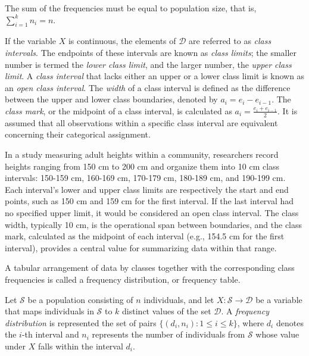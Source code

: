The sum of the frequencies must be equal to population size, that is, $\sum_{i=1}^k n_i = n$.

If the variable $X$ is continuous, the elements of $\mathcal{D}$ are referred to as \emph{class intervals}. The endpoints of these intervals are known as \emph{class limits}; the smaller number is termed the \emph{lower class limit}, and the larger number, the \emph{upper class limit}. A \emph{class interval} that lacks either an upper or a lower class limit is known as an \emph{open class interval}. The \emph{width} of a class interval is defined as the difference between the upper and lower class boundaries, denoted by $a_i = e_i - e_{i-1}$. The \emph{class mark}, or the midpoint of a class interval, is calculated as $a_i = \frac{e_i + e_{i-1}}{2}$. It is assumed that all observations within a specific class interval are equivalent concerning their categorical assignment.

\begin{example}
In a study measuring adult heights within a community, researchers record heights ranging from 150 cm to 200 cm and organize them into 10 cm class intervals: 150-159 cm, 160-169 cm, 170-179 cm, 180-189 cm, and 190-199 cm. Each interval's lower and upper class limits are respectively the start and end points, such as 150 cm and 159 cm for the first interval. If the last interval had no specified upper limit, it would be considered an open class interval. The class width, typically 10 cm, is the operational span between boundaries, and the class mark, calculated as the midpoint of each interval (e.g., 154.5 cm for the first interval), provides a central value for summarizing data within that range.
\end{example}

A tabular arrangement of data by classes together with the corresponding class frequencies is called a frequency distribution, or frequency table.

\begin{definition}
Let $\mathcal{S}$ be a population consisting of $n$ individuals, and let $X: \mathcal{S} \rightarrow \mathcal{D}$ be a variable that maps individuals in $\mathcal{S}$ to $k$ distinct values of the set $\mathcal{D}$. A \emph{frequency distribution} is represented the set of pairs $\{(d_i, n_i) : 1 \leq i \leq k\}$, where $d_i$ denotes the $i$-th interval and $n_i$ represents the number of individuals from $\mathcal{S}$ whose value under $X$ falls within the interval $d_i$.
\end{definition}

